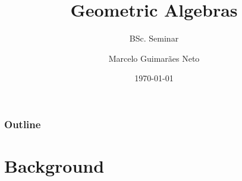 \documentclass{beamer}
\title{Geometric Algebras}
\subtitle{BSc. Seminar}
\author{Marcelo Guimarães Neto}
\institute{University of Helsinki}
\date{\today}
\newcommand{\bv}[1]{\boldsymbol{#1}}
\begin{document}
\begin{frame}
\titlepage
\end{frame}

\begin{frame}
\frametitle{Outline}
\tableofcontents
\end{frame}

\section{Background}

    
    
\end{document}
